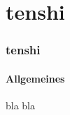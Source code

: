 \section{tenshi}
\begin{frame}
	\frametitle{tenshi}
	\framesubtitle{Allgemeines}
	bla bla
\end{frame}